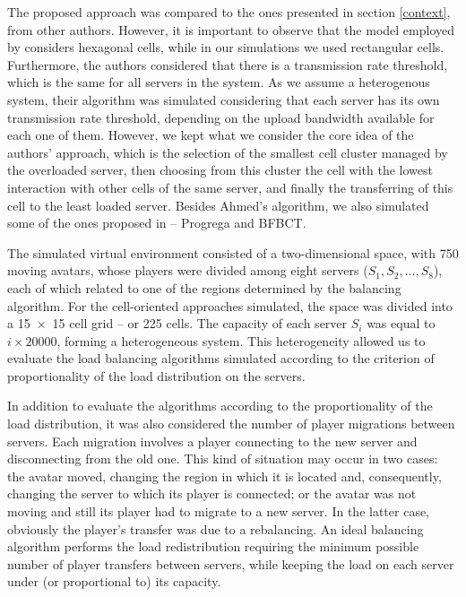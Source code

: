 \documentclass[acmjacm]{acmtrans2m}
\begin{document}
The proposed approach was compared to the ones presented in section \ref{context}, from other authors. However, it is important to observe that the model employed by \cite{ahmed2008mol} considers hexagonal cells, while in our simulations we used rectangular cells. Furthermore, the authors considered that there is a transmission rate threshold, which is the same for all servers in the system. As we assume a heterogenous system, their algorithm was simulated considering that each server has its own transmission rate threshold, depending on the upload bandwidth available for each one of them. However, we kept what we consider the core idea of the authors' approach, which is the selection of the smallest cell cluster managed by the overloaded server, then choosing from this cluster the cell with the lowest interaction with other cells of the same server, and finally the transferring of this cell to the least loaded server. Besides Ahmed's algorithm, we also simulated some of the ones proposed in \cite{bezerra2009lbs} -- Progrega and BFBCT.

The simulated virtual environment consisted of a two-dimensional space, with 750 moving avatars, whose players were divided among eight servers ($S_1, S_2, ..., S_8$), each of which related to one of the regions determined by the balancing algorithm. For the cell-oriented approaches simulated, the space was divided into a \mbox{15 $\times$ 15} cell grid -- or 225 cells. The capacity of each server $S_i$ was equal to $i \times 20000$, forming a heterogeneous system. This heterogeneity allowed us to evaluate the load balancing algorithms simulated according to the criterion of proportionality of the load distribution on the servers.

In addition to evaluate the algorithms according to the proportionality of the load distribution, it was also considered the number of player migrations between servers. Each migration involves a player connecting to the new server and disconnecting from the old one. This kind of situation may occur in two cases: the avatar moved, changing the region in which it is located and, consequently, changing the server to which its player is connected; or the avatar was not moving and still its player had to migrate to a new server. In the latter case, obviously the player's transfer was due to a rebalancing. An ideal balancing algorithm performs the load redistribution requiring the minimum possible number of player transfers between servers, while keeping the load on each server under (or proportional to) its capacity.
\end{document}

